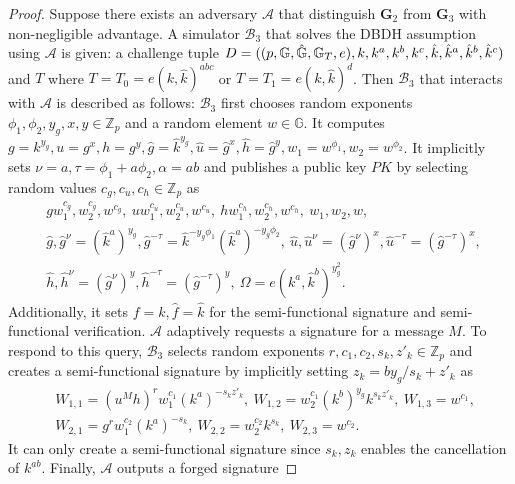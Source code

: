 \documentclass[11pt,letterpaper]{article}
\newcommand{\G}{\mathbb{G}}
\newcommand{\Z}{\mathbb{Z}}
\newcommand{\mc}[1]{\mathcal{#1}}
\newcommand{\tb}[1]{\textbf{#1}}
\newcommand{\lb}{\linebreak[0]}
\begin{document}
\begin{proof}
Suppose there exists an adversary $\mc{A}$ that distinguish $\tb{G}_2$ from
$\tb{G}_3$ with non-negligible advantage. A simulator $\mc{B}_3$ that solves
the DBDH assumption using $\mc{A}$ is given: a challenge tuple
    $D = ((p, \G, \hat{\G}, \G_T, e), \lb
    k, k^a, k^b, k^c, \lb \hat{k}, \hat{k}^a, \hat{k}^b, \hat{k}^c)$
    and $T$ where $T = T_0 = e(k, \hat{k})^{abc}$ or $T = T_1 = e(k, \hat{k})^d$.
Then $\mc{B}_3$ that interacts with $\mc{A}$ is described as follows:
$\mc{B}_3$ first chooses random exponents $\phi_1, \phi_2, y_g, x, y \in
\Z_p$ and a random element $w \in \G$. It computes
    $g = k^{y_g}, u = g^{x}, h = g^{y},
    \hat{g} = \hat{k}^{y_g}, \hat{u} = \hat{g}^{x}, \hat{h} = \hat{g}^{y},
    w_1 = w^{\phi_1}, w_2 = w^{\phi_2}$.
It implicitly sets $\nu = a, \tau = \phi_1 + a \phi_2, \alpha = ab$ and
publishes a public key $PK$ by selecting random values $c_g, c_u, c_h \in
\Z_p$ as
    \begin{align*}
    &   g w_1^{c_g}, w_2^{c_g}, w^{c_g},~
        u w_1^{c_u}, w_2^{c_u}, w^{c_u},~
        h w_1^{c_h}, w_2^{c_h}, w^{c_h},~
        w_1, w_2, w,~ \\
    &   \hat{g}, \hat{g}^{\nu} = (\hat{k}^a)^{y_g},
        \hat{g}^{-\tau} = \hat{k}^{-y_g \phi_1} (\hat{k}^a)^{-y_g \phi_2},~
        \hat{u}, \hat{u}^{\nu} = (\hat{g}^{\nu})^x,
        \hat{u}^{-\tau} = (\hat{g}^{-\tau})^x,~ \\
    &   \hat{h}, \hat{h}^{\nu} = (\hat{g}^{\nu})^y,
        \hat{h}^{-\tau} = (\hat{g}^{-\tau})^y,~
        \Omega = e(k^a,\hat{k}^b)^{y_g^2}.
    \end{align*}
Additionally, it sets $f = k, \hat{f} = \hat{k}$ for the semi-functional
signature and semi-functional verification. $\mc{A}$ adaptively requests a
signature for a message $M$. To respond to this query, $\mc{B}_3$ selects
random exponents $r, c_1, c_2, s_k, z'_k \in \Z_p$ and creates a
semi-functional signature by implicitly setting $z_k = b y_g / s_k + z'_k$ as
    \begin{align*}
    &   W_{1,1} = (u^M h)^r w_1^{c_1} (k^a)^{-s_k z'_k},~
        W_{1,2} = w_2^{c_1} (k^b)^{y_g} k^{s_k z'_k},~
        W_{1,3} = w^{c_1}, \\
    &   W_{2,1} = g^r w_1^{c_2} (k^a)^{-s_k},~
        W_{2,2} = w_2^{c_2} k^{s_k},~
        W_{2,3} = w^{c_2}.
    \end{align*}
It can only create a semi-functional signature since $s_k, z_k$ enables the
cancellation of $k^{ab}$. Finally, $\mc{A}$ outputs a forged signature

\end{proof}
\end{document}
